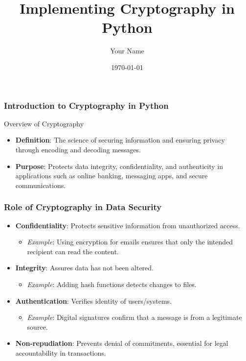 \documentclass{beamer}
\title{Implementing Cryptography in Python}
\author{Your Name}
\institute{Your Institution}
\date{\today}
\begin{document}
\frame{\titlepage}

\begin{frame}[fragile]
    \frametitle{Introduction to Cryptography in Python}
    \begin{block}{Overview of Cryptography}
        \begin{itemize}
            \item \textbf{Definition}: The science of securing information and ensuring privacy through encoding and decoding messages.
            \item \textbf{Purpose}: Protects data integrity, confidentiality, and authenticity in applications such as online banking, messaging apps, and secure communications.
        \end{itemize}
    \end{block}
\end{frame}

\begin{frame}[fragile]
    \frametitle{Role of Cryptography in Data Security}
    \begin{itemize}
        \item \textbf{Confidentiality}: Protects sensitive information from unauthorized access.
        \begin{itemize}
            \item \textit{Example}: Using encryption for emails ensures that only the intended recipient can read the content.
        \end{itemize}
        
        \item \textbf{Integrity}: Assures data has not been altered.
        \begin{itemize}
            \item \textit{Example}: Adding hash functions detects changes to files.
        \end{itemize}
        
        \item \textbf{Authentication}: Verifies identity of users/systems.
        \begin{itemize}
            \item \textit{Example}: Digital signatures confirm that a message is from a legitimate source.
        \end{itemize}
        
        \item \textbf{Non-repudiation}: Prevents denial of commitments, essential for legal accountability in transactions.
    \end{itemize}
\end{frame}
\end{document}
